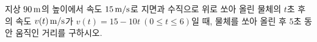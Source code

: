 지상 $90\mkern3mu \mathrm{m}$의 높이에서 속도 $15\mkern3mu \mathrm{m/s}$로 지면과 수직으로 위로 쏘아 올린 물체의 $t$초 후의 속도 $v(t)\mkern3mu \mathrm{m/s}$가 $v(t)=15-10t\ (0\le t\le 6)$일 때, 물체를 쏘아 올린 후 \mbox{$5$초} 동안 움직인 거리를 구하시오.
